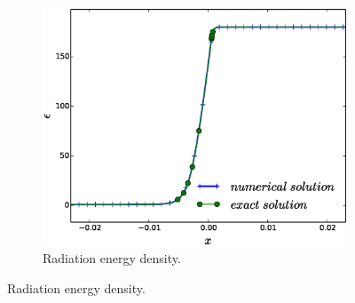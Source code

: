 \documentclass[times,doublespace]{fldauth}%
\begin{document}
\begin{figure}[h]
    ~
    \begin{subfigure}{0.32\textwidth}
    \centering
    \includegraphics[width=\linewidth]{figures/cst-xs/mach-3/mass-diff-radiation-nel-1000-plot.eps}
    \caption{Radiation energy density.}\label{fig:mach-3-cst-xs-rad}
    \end{subfigure}
    

\end{figure}
\end{document}
